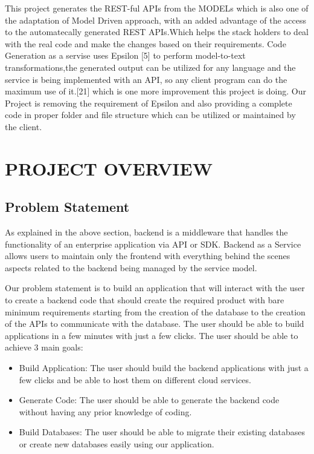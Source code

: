 \documentclass[letterpaper, 10 pt, conference]{ieeeconf}
\begin{document}
This project generates the REST-ful APIs from the MODELs which is also one of the adaptation of Model Driven approach, with an added advantage of the access to the automatecally generated REST APIs.Which helps the stack holders to deal with the real code and make the changes based on their requirements.
Code Generation as a servise uses Epsilon [5] to perform model-to-text transformations,the generated output can be utilized for any language and the service is being implemented with an API, so any client program can do the maximum use of it.[21] which is one more improvement this project is doing. Our Project is removing the requirement of Epsilon and also providing a complete code in proper folder and file structure which can be utilized or maintained by the client. 


\section{PROJECT OVERVIEW}
\subsection{Problem Statement}
As explained in the above section, backend is a middleware that handles the functionality of an enterprise application via API or SDK.  Backend as a Service allows users to maintain only the frontend with everything behind the scenes aspects related to the backend being managed by the service model. 

Our problem statement is to build an application that will interact with the user to create a backend code that should create the required product with bare minimum requirements starting from the creation of the database to the creation of the APIs to communicate with the database. The user should be able to build applications in a few minutes with just a few clicks. The user should be able to achieve 3 main goals:
\begin{itemize}
  \item Build Application:
  The user should build the backend applications with just a few clicks and be able to host them on different cloud services.
  \item Generate Code:
  The user should be able to generate the backend code without having any prior knowledge of coding.
  \item Build Databases:
  The user should be able to migrate their existing databases or create new databases easily using our application.
\end{itemize}
\end{document}
